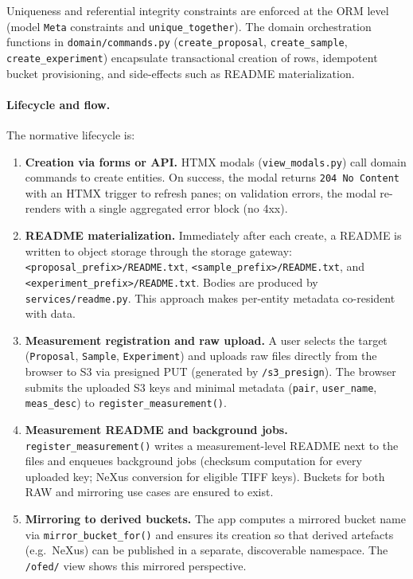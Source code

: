 Uniqueness and referential integrity constraints are enforced at the ORM level (model \texttt{Meta} constraints and \texttt{unique\_together}). The domain orchestration functions in \texttt{domain/commands.py} (\texttt{create\_proposal}, \texttt{create\_sample}, \texttt{create\_experiment}) encapsulate transactional creation of rows, idempotent bucket provisioning, and side-effects such as README materialization.

\paragraph{Lifecycle and flow.}
The normative lifecycle is:

\begin{enumerate}
	\item \textbf{Creation via forms or API.} HTMX modals (\texttt{view\_modals.py}) call domain commands to create entities. On success, the modal returns \texttt{204 No Content} with an HTMX trigger to refresh panes; on validation errors, the modal re-renders with a single aggregated error block (no 4xx).
	
	\item \textbf{README materialization.} Immediately after each create, a README is written to object storage through the storage gateway: \texttt{<proposal\_prefix>/README.txt}, \texttt{<sample\_prefix>/README.txt}, and \texttt{<experiment\_prefix>/README.txt}. Bodies are produced by \texttt{services/readme.py}. This approach makes per-entity metadata co-resident with data.
	
	\item \textbf{Measurement registration and raw upload.} A user selects the target (\texttt{Proposal}, \texttt{Sample}, \texttt{Experiment}) and uploads raw files directly from the browser to S3 via presigned PUT (generated by \texttt{/s3\_presign}). The browser submits the uploaded S3 keys and minimal metadata (\texttt{pair}, \texttt{user\_name}, \texttt{meas\_desc}) to \texttt{register\_measurement()}.
	
	\item \textbf{Measurement README and background jobs.} \texttt{register\_measurement()} writes a measurement-level README next to the files and enqueues background jobs (checksum computation for every uploaded key; NeXus conversion for eligible TIFF keys). Buckets for both RAW and mirroring use cases are ensured to exist.
	
	\item \textbf{Mirroring to derived buckets.} The app computes a mirrored bucket name via \texttt{mirror\_bucket\_for()} and ensures its creation so that derived artefacts (e.g.\ NeXus) can be published in a separate, discoverable namespace. The \texttt{/ofed/} view shows this mirrored perspective.
\end{enumerate}

